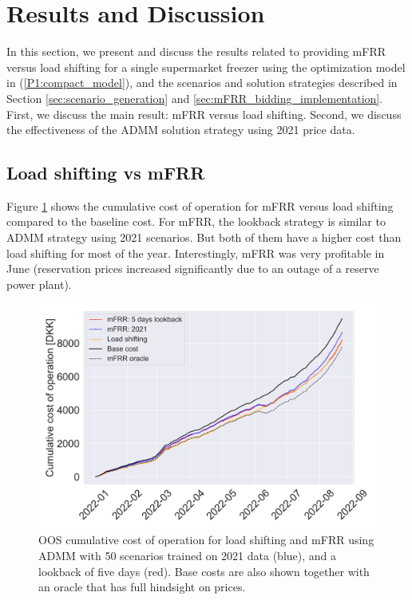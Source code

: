 
\section{Results and Discussion}\label{sec:results}

In this section, we present and discuss the results related to providing mFRR versus load shifting for a single supermarket freezer using the optimization model in (\ref{P1:compact_model}), and the scenarios and solution strategies described in Section \ref{sec:scenario_generation} and \ref{sec:mFRR_bidding_implementation}. First, we discuss the main result: mFRR versus load shifting. Second, we discuss the effectiveness of the ADMM solution strategy using 2021 price data.

\subsection{Load shifting vs mFRR}

Figure \ref{fig:cumulative_cost_comparison} shows the cumulative cost of operation for mFRR versus load shifting compared to the baseline cost. For mFRR, the lookback strategy is similar to ADMM strategy using 2021 scenarios. But both of them have a higher cost than load shifting for most of the year. Interestingly, mFRR was very profitable in June (reservation prices increased significantly due to an outage of a reserve power plant).

\begin{figure}[!t]
    \centering
    \includegraphics[width=\columnwidth]{../figures/cumulative_cost_comparison.png}
    \caption{OOS cumulative cost of operation for load shifting and mFRR using ADMM with 50 scenarios trained on 2021 data (blue), and a lookback of five days (red). Base costs are also shown together with an oracle that has full hindsight on prices.}
    \label{fig:cumulative_cost_comparison}
\end{figure}

